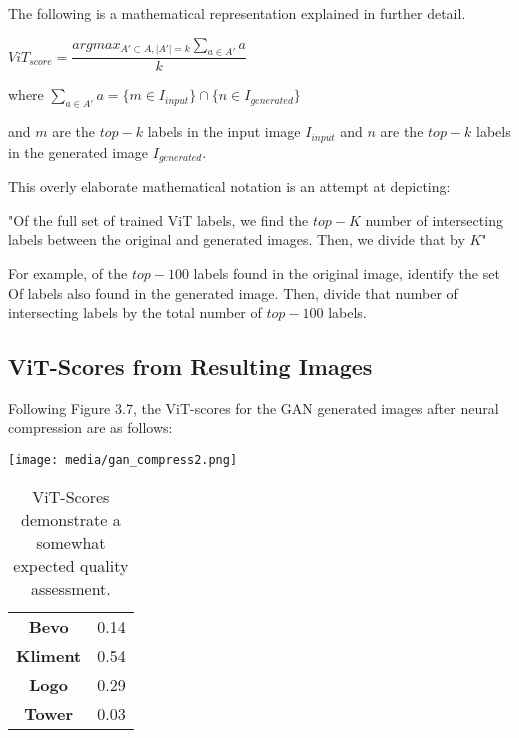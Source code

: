 The following is a mathematical representation explained in further detail.

\begin{center}
    $ViT_{score} = \displaystyle\dfrac{argmax_{A'\subset A,\lvert A' \rvert = k } \sum_{a \in A'} {a} }{k} $
\end{center}

where $\sum_{a \in A'} {a}  = \lbrace{m \in I_{input}}\rbrace \cap \lbrace{n \in I_{generated}}\rbrace$

and $m$ are the $top-k$ labels in the input image $I_{input}$
and $n$ are the $top-k$ labels in the generated image $I_{generated}$.


This overly elaborate mathematical notation is an attempt at depicting:

"Of the full set of trained ViT labels, we find the $top-K$ number of intersecting labels
between the original and generated images. Then, we divide that by $K$"


For example, of the $top-100$ labels found in the original image, 
identify the set Of labels also found in the generated image. 
Then, divide that number of intersecting
labels by the total number of $top-100$ labels.


\subsection{ViT-Scores from Resulting Images}


Following Figure 3.7, the ViT-scores for the GAN generated images after neural compression
are as follows:

\begin{center}
	\texttt{[image: media/gan\_compress2.png]}
\end{center}

\begin{table}[H]
\begin{center}
\begin{tabular}{|c|c|}
\hline
\textbf{Bevo}	& 0.14\\
\textbf{Kliment}	& 0.54\\
\textbf{Logo}	& 0.29\\
\textbf{Tower} & 0.03\\\hline

\end{tabular}
\caption[ViT-Scores of Generated Images]{ViT-Scores demonstrate a somewhat expected quality assessment.}
\end{center}
\end{table}



